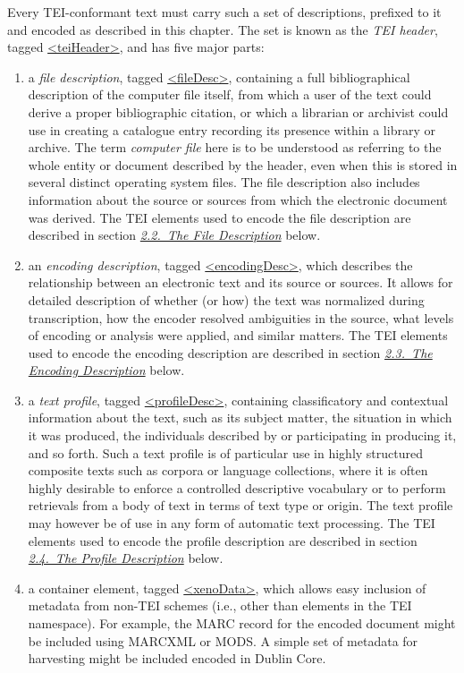 Every TEI-conformant text must carry such a set of descriptions, prefixed to it and encoded as described in this chapter. The set is known as the \textit{TEI header}, tagged \hyperref[TEI.teiHeader]{<teiHeader>}, and has five major parts: \begin{enumerate}
\item a \textit{file description}, tagged \hyperref[TEI.fileDesc]{<fileDesc>}, containing a full bibliographical description of the computer file itself, from which a user of the text could derive a proper bibliographic citation, or which a librarian or archivist could use in creating a catalogue entry recording its presence within a library or archive. The term \textit{computer file} here is to be understood as referring to the whole entity or document described by the header, even when this is stored in several distinct operating system files. The file description also includes information about the source or sources from which the electronic document was derived. The TEI elements used to encode the file description are described in section \textit{\hyperref[HD2]{2.2.\ The File Description}} below.
\item an \textit{encoding description}, tagged \hyperref[TEI.encodingDesc]{<encodingDesc>}, which describes the relationship between an electronic text and its source or sources. It allows for detailed description of whether (or how) the text was normalized during transcription, how the encoder resolved ambiguities in the source, what levels of encoding or analysis were applied, and similar matters. The TEI elements used to encode the encoding description are described in section \textit{\hyperref[HD5]{2.3.\ The Encoding Description}} below.
\item a \textit{text profile}, tagged \hyperref[TEI.profileDesc]{<profileDesc>}, containing classificatory and contextual information about the text, such as its subject matter, the situation in which it was produced, the individuals described by or participating in producing it, and so forth. Such a text profile is of particular use in highly structured composite texts such as corpora or language collections, where it is often highly desirable to enforce a controlled descriptive vocabulary or to perform retrievals from a body of text in terms of text type or origin. The text profile may however be of use in any form of automatic text processing. The TEI elements used to encode the profile description are described in section \textit{\hyperref[HD4]{2.4.\ The Profile Description}} below.
\item a container element, tagged \hyperref[TEI.xenoData]{<xenoData>}, which allows easy inclusion of metadata from non-TEI schemes (i.e., other than elements in the TEI namespace). For example, the MARC record for the encoded document might be included using MARCXML or MODS. A simple set of metadata for harvesting might be included encoded in Dublin Core.

\end{enumerate}
